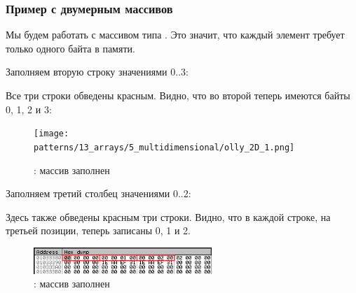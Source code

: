\subsubsection{Пример с двумерным массивов}

Мы будем работать с массивом типа \Tchar. Это значит, что каждый элемент требует
только одного байта в памяти.

\myindex{\olly}

Заполняем вторую строку значениями 0..3:



Все три строки обведены красным. 
Видно, что во второй теперь имеются байты 0, 1, 2 и 3:

\begin{figure}[H]
\centering
\texttt{[image: patterns/13\_arrays/5\_multidimensional/olly\_2D\_1.png]}
\caption{\olly: массив заполнен}
\end{figure}

\myindex{\olly}

Заполняем третий столбец значениями 0..2:



Здесь также обведены красным три строки. 
Видно, что в каждой строке, на третьей позиции, теперь записаны 0, 1 и 2.

\begin{figure}[H]
\centering
\includegraphics[width=0.6\textwidth]{patterns/13_arrays/5_multidimensional/olly_2D_2.png}
\caption{\olly: массив заполнен}
\end{figure}
